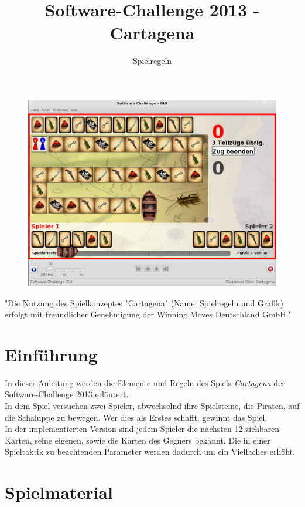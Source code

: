\documentclass[a4paper, ngerman]{scrartcl}
\title{Software-Challenge 2013 - Cartagena}
\subtitle{Spielregeln}
\begin{document}
\maketitle

\begin{figure}[h]
	\centering
	\includegraphics[width=\linewidth]{bilder/Uebersicht.png}
\end{figure}
\vspace*{\fill}
"Die Nutzung des Spielkonzeptes "Cartagena" (Name, Spielregeln und Grafik)
erfolgt mit freundlicher Genehmigung der Winning Moves Deutschland GmbH."
\newpage
\tableofcontents
\newpage

\section{Einführung}
In dieser Anleitung werden die Elemente und Regeln des Spiels \emph{Cartagena}
der Software-Challenge 2013 erläutert.\\
In dem Spiel versuchen zwei Spieler,
abwechselnd ihre Spielsteine, die Piraten, auf die Schaluppe zu bewegen. Wer
dies als Erstes schafft, gewinnt das Spiel.\\
In der implementierten Version sind jedem Spieler die nächsten 12 ziehbaren
Karten, seine eigenen, sowie die Karten des Gegners bekannt. Die
in einer Spieltaktik zu beachtenden Parameter werden dadurch um ein Vielfaches
erhöht.

\section{Spielmaterial}
\end{document}
